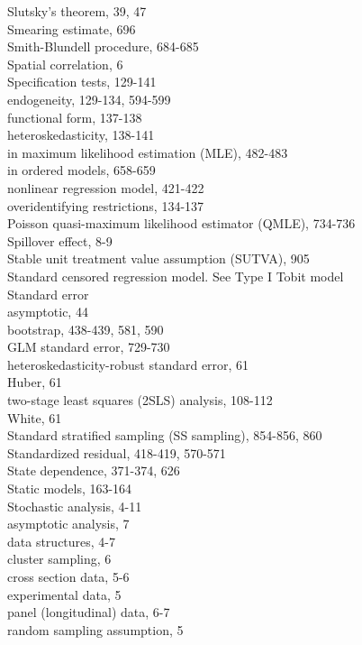 \documentclass[10pt]{article}
\begin{document}
Slutsky's theorem, 39, 47\\
Smearing estimate, 696\\
Smith-Blundell procedure, 684-685\\
Spatial correlation, 6\\
Specification tests, 129-141\\
endogeneity, 129-134, 594-599\\
functional form, 137-138\\
heteroskedasticity, 138-141\\
in maximum likelihood estimation (MLE), 482-483\\
in ordered models, 658-659\\
nonlinear regression model, 421-422\\
overidentifying restrictions, 134-137\\
Poisson quasi-maximum likelihood estimator (QMLE), 734-736\\
Spillover effect, 8-9\\
Stable unit treatment value assumption (SUTVA), 905\\
Standard censored regression model. See Type I Tobit model\\
Standard error\\
asymptotic, 44\\
bootstrap, 438-439, 581, 590\\
GLM standard error, 729-730\\
heteroskedasticity-robust standard error, 61\\
Huber, 61\\
two-stage least squares (2SLS) analysis, 108-112\\
White, 61\\
Standard stratified sampling (SS sampling), 854-856, 860\\
Standardized residual, 418-419, 570-571\\
State dependence, 371-374, 626\\
Static models, 163-164\\
Stochastic analysis, 4-11\\
asymptotic analysis, 7\\
data structures, 4-7\\
cluster sampling, 6\\
cross section data, 5-6\\
experimental data, 5\\
panel (longitudinal) data, 6-7\\
random sampling assumption, 5\\
\end{document}
